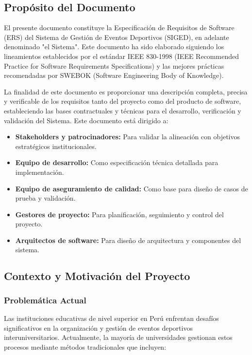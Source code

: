 \documentclass[12pt,a4paper]{article}
\begin{document}
\subsection{Propósito del Documento}

El presente documento constituye la Especificación de Requisitos de Software (ERS) del Sistema de Gestión de Eventos Deportivos (SIGED), en adelante denominado "el Sistema". Este documento ha sido elaborado siguiendo los lineamientos establecidos por el estándar IEEE 830-1998 (IEEE Recommended Practice for Software Requirements Specifications) y las mejores prácticas recomendadas por SWEBOK (Software Engineering Body of Knowledge).

La finalidad de este documento es proporcionar una descripción completa, precisa y verificable de los requisitos tanto del proyecto como del producto de software, estableciendo las bases contractuales y técnicas para el desarrollo, verificación y validación del Sistema. Este documento está dirigido a:

\begin{itemize}[noitemsep]
    \item \textbf{Stakeholders y patrocinadores:} Para validar la alineación con objetivos estratégicos institucionales.
    \item \textbf{Equipo de desarrollo:} Como especificación técnica detallada para implementación.
    \item \textbf{Equipo de aseguramiento de calidad:} Como base para diseño de casos de prueba y validación.
    \item \textbf{Gestores de proyecto:} Para planificación, seguimiento y control del proyecto.
    \item \textbf{Arquitectos de software:} Para diseño de arquitectura y componentes del sistema.
\end{itemize}

\subsection{Contexto y Motivación del Proyecto}

\subsubsection{Problemática Actual}

Las instituciones educativas de nivel superior en Perú enfrentan desafíos significativos en la organización y gestión de eventos deportivos interuniversitarios. Actualmente, la mayoría de universidades gestionan estos procesos mediante métodos tradicionales que incluyen:
\end{document}

